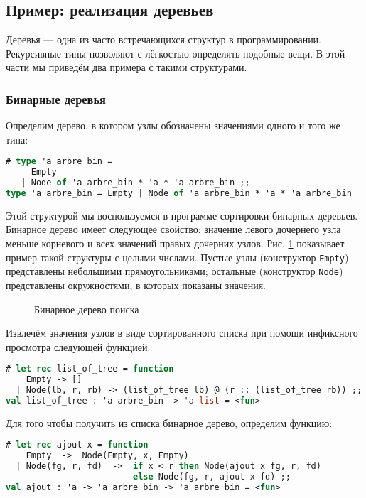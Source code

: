 \subsection{Пример: реализация деревьев}

Деревья --- одна из часто встречающихся структур в программировании. Рекурсивные
типы позволяют с лёгкостью определять подобные вещи. В этой части мы приведём
два примера с такими структурами.

\subsubsection{Бинарные деревья}

Определим дерево, в котором узлы обозначены значениями одного и того же типа:

\begin{lstlisting}[language=OCaml]
# type 'a arbre_bin =
     Empty
   | Node of 'a arbre_bin * 'a * 'a arbre_bin ;;
type 'a arbre_bin = Empty | Node of 'a arbre_bin * 'a * 'a arbre_bin
\end{lstlisting}

Этой структурой мы воспользуемся в программе сортировки бинарных деревьев.
Бинарное дерево имеет следующее свойство: значение левого дочернего узла меньше
корневого и всех значений правых дочерних узлов. Рис. \ref{fig:bin_search_tree}
показывает пример такой структуры с целыми числами. Пустые узлы (конструктор
\texttt{Empty}) представлены небольшими прямоугольниками; остальные (конструктор
\texttt{Node}) представлены окружностями, в которых показаны значения.

\begin{figure}[h]
	\caption{Бинарное дерево поиска}
	\label{fig:bin_search_tree}
\end{figure}

Извлечём значения узлов в виде сортированного списка при помощи инфиксного
просмотра следующей функцией:

\begin{lstlisting}[language=OCaml]
# let rec list_of_tree = function
    Empty -> []
  | Node(lb, r, rb) -> (list_of_tree lb) @ (r :: (list_of_tree rb)) ;;
val list_of_tree : 'a arbre_bin -> 'a list = <fun>
\end{lstlisting}

Для того чтобы получить из списка бинарное дерево, определим функцию:

\begin{lstlisting}[language=OCaml]
# let rec ajout x = function
    Empty  ->  Node(Empty, x, Empty)
  | Node(fg, r, fd)  ->  if x < r then Node(ajout x fg, r, fd)
                         else Node(fg, r, ajout x fd) ;;
val ajout : 'a -> 'a arbre_bin -> 'a arbre_bin = <fun>
\end{lstlisting}


